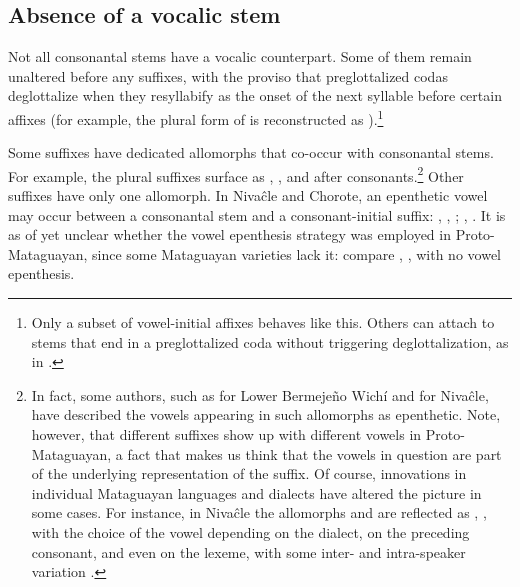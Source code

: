 \subsection{Absence of a vocalic stem}\label{no-voc-stem}

Not all consonantal stems have a vocalic counterpart. Some of them remain unaltered before any suffixes, with the proviso that preglottalized codas deglottalize when they resyllabify as the onset of the next syllable before certain affixes (for example, the plural form of  is reconstructed as ).\footnote{Only a subset of vowel-initial affixes behaves like this. Others can attach to stems that end in a preglottalized coda without triggering deglottalization, as in .}

Some suffixes have dedicated allomorphs that co-occur with consonantal stems. For example, the plural suffixes surface as , , and  after consonants.\footnote{In fact, some authors, such as \citet[190]{VN14} for Lower Bermejeño Wichí and \citet[274-8]{AnG15} for Nivaĉle, have described the vowels appearing in such allomorphs as epenthetic. Note, however, that different suffixes show up with different vowels in Proto-Mataguayan, a fact that makes us think that the vowels in question are part of the underlying representation of the suffix. Of course, innovations in individual Mataguayan languages and dialects have altered the picture in some cases. For instance, in Nivaĉle the allomorphs  and  are reflected as , , with the choice of the vowel depending on the dialect, on the preceding consonant, and even on the lexeme, with some inter\mbox{-} and intra-speaker variation \citep{AnG15}.} Other suffixes have only one allomorph. In Nivaĉle and Chorote, an epenthetic vowel may occur between a consonantal stem and a consonant-initial suffix: , ,  \citep[68--69]{AnG15};
,  \citep{JC14a}. It is as of yet unclear whether the vowel epenthesis strategy was employed in Proto-Mataguayan, since some Mataguayan varieties lack it: compare ,  \citep[56, 172]{KC16}, with no vowel epenthesis.

